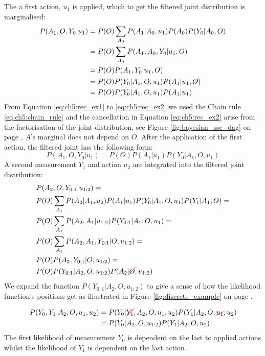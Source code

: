 \begin{appendices}
The a first action, $u_1$ is applied, which to get the filtered joint distribution is marginalised:
\begin{align}
  P(A_1,O,Y_0|u_1) &= P(O)\sum\limits_{A_0} P(A_1|A_0,u_1) P(A_0) P(Y_0|A_0,O)\\
                   &= P(O)\sum\limits_{A_0} P(A_1,A_0,Y_0|u_1,O)\\
                   &= P(O) P(A_1,Y_0|u_1,O) \label{eq:ch5:rec_ex1}\\
                   &= P(O) P(Y_0|A_1,O,u_1) P(A_1|u_1,\Ccancel[red]{O}) \label{eq:ch5:rec_ex2}\\
                   &= P(O) P(Y_0|A_1,O,u_1) P(A_1|u_1) 
\end{align} 
From Equation \ref{eq:ch5:rec_ex1} to \ref{eq:ch5:rec_ex2} we used the Chain rule \ref{eq:ch5:chain_rule} and 
the cancellation in Equation \ref{eq:ch5:rec_ex2} arise from the factorisation of the joint distribution, 
see Figure \ref{fig:bayesian_sse_dag} on page \pageref{fig:bayesian_sse_dag}, $A$'s marginal does not depend on $O$.
After the application of the first action, the filtered joint has the following form:
\begin{equation}
 P(A_1,O,Y_0|u_1) = P(O) P(A_1|u_1) P(Y_0|A_1,O,u_1)
\end{equation}
A second measurement $Y_1$ and action $u_2$ are integrated into the filtered joint distribution:
\begin{align}
 &P(A_2,O,Y_{0:1}|u_{1:2}) = \nonumber \\
 &P(O) \sum\limits_{A_1} P(A_2|A_1,u_2) P(A_1|u_1) P(Y_0|A_1,O,u_1) P(Y_1|A_1,O) = \nonumber\\
 &P(O) \sum\limits_{A_1} P(A_2,A_1|u_{1:2}) P(Y_{0:1}|A_1,O,u_1) = \nonumber \\
 &P(O) \sum\limits_{A_1} P(A_2,A_1,Y_{0:1}|O,u_{1:2}) = \nonumber \\
 &P(O) P(A_2,Y_{0:1}|O,u_{1:2}) = \\
 &P(O) P(Y_{0:1}|A_2,O,u_{1:2})P(A_2|\Ccancel[red]{O},u_{1:2}) \label{eq:ch5:rec_ex3} 
\end{align}
We expand the function $P(Y_{0:1}|A_2,O,u_{1:2})$ to give a sense of how the likelihood function's positions 
get as illustrated in Figure \ref{fig:discrete_example} on page \pageref{fig:discrete_example}.

\begin{align}
  P(Y_0,Y_1|A_2,O,u_1,u_2) &= P(Y_0|\Ccancel[red]{Y_1},A_2,O,u_1,u_2) P(Y_1|A_2,O,\Ccancel[red]{u_1},u_2) \\
		           &= P(Y_0|A_2,O,u_{1:2}) P(Y_1|A_2,O,u_2)
\end{align}
The first likelihood of measurement $Y_0$ is dependent on the last to applied actions whilst the likelihood
of $Y_1$ is dependent on the last action.
 

\end{appendices}
